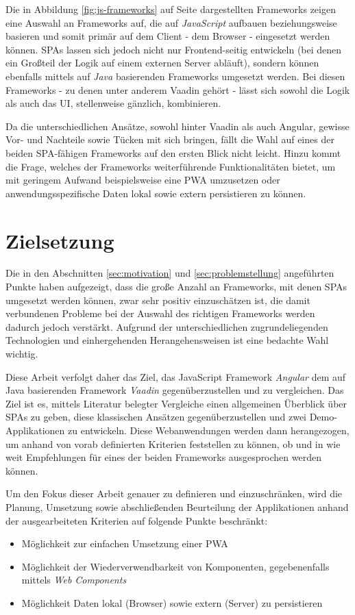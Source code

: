 \documentclass[a4paper,12pt,twoside]{scrreprt}
\begin{document}
Die in Abbildung \ref{fig:js-frameworks} auf Seite \pageref{fig:js-frameworks} dargestellten Frameworks zeigen eine Auswahl an Frameworks auf, die auf \textit{JavaScript} aufbauen beziehungsweise basieren und somit primär auf dem Client - dem Browser - eingesetzt werden können. \acp{SPA} lassen sich jedoch nicht nur Frontend-seitig entwickeln (bei denen ein Großteil der Logik auf einem externen Server abläuft), sondern können ebenfalls mittels auf \textit{Java} basierenden Frameworks umgesetzt werden. Bei diesen Frameworks - zu denen unter anderem Vaadin gehört - lässt sich sowohl die Logik als auch das \ac{UI}, stellenweise gänzlich, kombinieren.

Da die unterschiedlichen Ansätze, sowohl hinter Vaadin als auch Angular, gewisse Vor- und Nachteile sowie Tücken mit sich bringen, fällt die Wahl auf eines der beiden \ac{SPA}-fähigen Frameworks auf den ersten Blick nicht leicht. Hinzu kommt die Frage, welches der Frameworks weiterführende Funktionalitäten bietet, um mit geringem Aufwand beispielsweise eine \ac{PWA} umzusetzen oder anwendungsspezifische Daten lokal sowie extern persistieren zu können.

\section{Zielsetzung}
\label{sec:zielsetzung}
Die in den Abschnitten \ref{sec:motivation} und \ref{sec:problemstellung} angeführten Punkte haben aufgezeigt, dass die große Anzahl an Frameworks, mit denen \acp{SPA} umgesetzt werden können, zwar sehr positiv einzuschätzen ist, die damit verbundenen Probleme bei der Auswahl des richtigen Frameworks werden dadurch jedoch verstärkt. Aufgrund der unterschiedlichen zugrundeliegenden Technologien und einhergehenden Herangehensweisen ist eine bedachte Wahl wichtig.

Diese Arbeit verfolgt daher das Ziel, das JavaScript Framework \textit{Angular} dem auf Java basierenden Framework \textit{Vaadin} gegenüberzustellen und zu vergleichen. Das Ziel ist es, mittels Literatur belegter Vergleiche einen allgemeinen Überblick über \acp{SPA} zu geben, diese klassischen Ansätzen gegenüberzustellen und zwei Demo-Applikationen zu entwickeln. Diese Webanwendungen werden dann herangezogen, um anhand von vorab definierten Kriterien feststellen zu können, ob und in wie weit Empfehlungen für eines der beiden Frameworks ausgesprochen werden können.

\medskip

Um den Fokus dieser Arbeit genauer zu definieren und einzuschränken, wird die Planung, Umsetzung sowie abschließenden Beurteilung der Applikationen anhand der ausgearbeiteten Kriterien auf folgende Punkte beschränkt:
\begin{itemize}
    \item Möglichkeit zur einfachen Umsetzung einer \acf{PWA}
    \item Möglichkeit der Wiederverwendbarkeit von Komponenten, gegebenenfalls mittels \textit{Web Components}
    \item Möglichkeit Daten lokal (Browser) sowie extern (Server) zu persistieren
\end{itemize}
\end{document}
